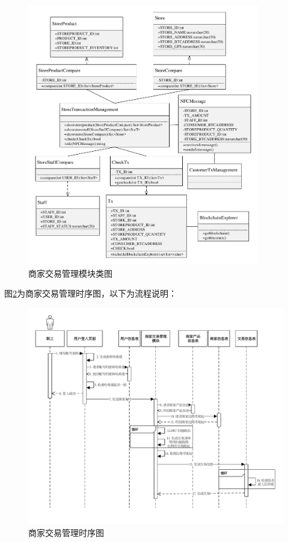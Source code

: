 	\begin{figure}[!htbp]
		\centering
		\includegraphics[width = 0.9\textwidth]{c5.pdf}
		\caption{商家交易管理模块类图}\label{c5}
	\end{figure}


图\ref{time4}为商家交易管理时序图，以下为流程说明：

	\begin{figure}[!htbp]
		\centering
		\includegraphics[width = 1\textwidth]{time4.pdf}
		\caption{商家交易管理时序图}\label{time4}
	\end{figure}

